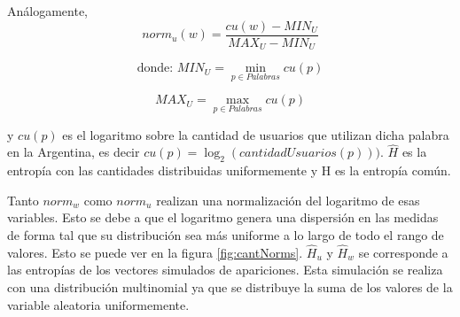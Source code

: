 Análogamente,
\begin{equation}
norm_{u}(w) = \frac{cu(w)- MIN_U }{MAX_U - MIN_U}
\label{eq:norm2}
\end{equation}
\noindent\begin{minipage}{.5\linewidth}
\begin{equation}
 \text{donde: } MIN_U = \min\limits_{p \in Palabras} cu(p)
\end{equation}
\end{minipage}%
\begin{minipage}{.5\linewidth}
\begin{equation}
  MAX_U = \max\limits_{p \in Palabras} cu(p)
\end{equation}
\end{minipage}
y $cu(p)$ es el logaritmo sobre  la cantidad de usuarios que utilizan dicha palabra en la Argentina, es decir $cu(p)= \log_2(cantidadUsuarios(p)))$.
$\widehat{H}$ es la entropía con las cantidades distribuidas uniformemente y H es la entropía común.

Tanto $norm_{w}$ como $norm_{u}$ realizan una normalización del logaritmo de esas variables. Esto se debe a que el logaritmo genera una dispersión en las medidas de forma tal que su distribución sea más uniforme a lo largo de todo el rango de valores. Esto se puede ver en la figura \ref{fig:cantNorms}.
$\widehat{H}_{u}$ y $\widehat{H}_{w}$ se corresponde a las entropías de los vectores simulados de apariciones. %
Esta simulación se realiza con una distribución multinomial ya que se distribuye la suma de los valores de la variable aleatoria uniformemente. 


